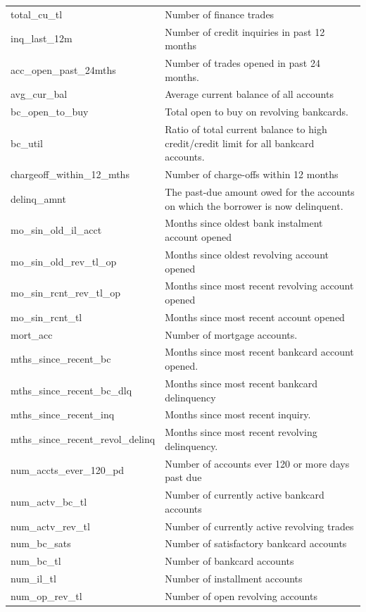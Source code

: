 \documentclass[11pt,]{report}
\begin{document}
\begin{longtable}[t]{>{\raggedright\arraybackslash}p{7cm}>{\raggedright\arraybackslash}p{7cm}}
total\_cu\_tl & Number of finance trades\\
inq\_last\_12m & Number of credit inquiries in past 12 months\\
acc\_open\_past\_24mths & Number of trades opened in past 24 months.\\
avg\_cur\_bal & Average current balance of all accounts\\
\addlinespace
bc\_open\_to\_buy & Total open to buy on revolving bankcards.\\
bc\_util & Ratio of total current balance to high credit/credit limit for all bankcard accounts.\\
chargeoff\_within\_12\_mths & Number of charge-offs within 12 months\\
delinq\_amnt & The past-due amount owed for the accounts on which the borrower is now delinquent.\\
mo\_sin\_old\_il\_acct & Months since oldest bank instalment account opened\\
\addlinespace
mo\_sin\_old\_rev\_tl\_op & Months since oldest revolving account opened\\
mo\_sin\_rcnt\_rev\_tl\_op & Months since most recent revolving account opened\\
mo\_sin\_rcnt\_tl & Months since most recent account opened\\
mort\_acc & Number of mortgage accounts.\\
mths\_since\_recent\_bc & Months since most recent bankcard account opened.\\
\addlinespace
mths\_since\_recent\_bc\_dlq & Months since most recent bankcard delinquency\\
mths\_since\_recent\_inq & Months since most recent inquiry.\\
mths\_since\_recent\_revol\_delinq & Months since most recent revolving delinquency.\\
num\_accts\_ever\_120\_pd & Number of accounts ever 120 or more days past due\\
num\_actv\_bc\_tl & Number of currently active bankcard accounts\\
\addlinespace
num\_actv\_rev\_tl & Number of currently active revolving trades\\
num\_bc\_sats & Number of satisfactory bankcard accounts\\
num\_bc\_tl & Number of bankcard accounts\\
num\_il\_tl & Number of installment accounts\\
num\_op\_rev\_tl & Number of open revolving accounts\\

\end{longtable}
\end{document}

